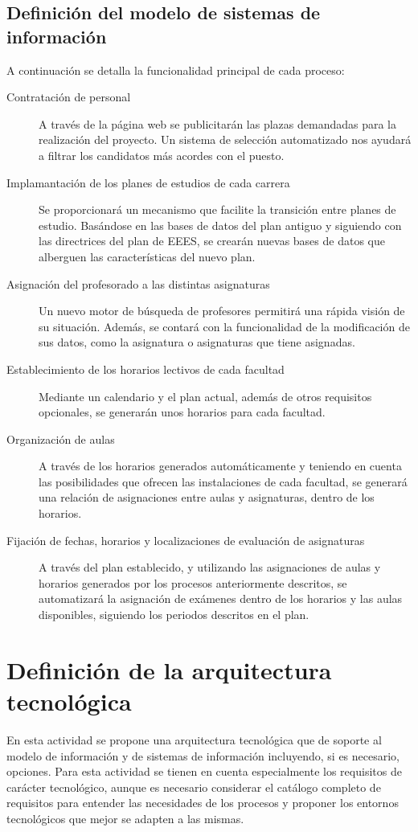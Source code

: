 \documentclass[11pt,a4paper,spanish,twoside]{book}
\begin{document}
\begin{itemize}
\section{Definición del modelo de sistemas de información}
A continuación se detalla la funcionalidad principal de cada proceso:
\begin{description}
\item[Contratación de personal] A través de la página web se publicitarán las plazas demandadas para la realización del proyecto. Un sistema de selección automatizado nos ayudará a filtrar los candidatos más acordes con el puesto.
\item[Implamantación de los planes de estudios de cada carrera] Se proporcionará un mecanismo que facilite la transición entre planes de estudio. Basándose en las bases de datos del plan antiguo y siguiendo con las directrices del plan de EEES, se crearán nuevas bases de datos que alberguen las características del nuevo plan.
\item[Asignación del profesorado a las distintas asignaturas] Un nuevo motor de búsqueda de profesores permitirá una rápida visión de su situación. Además, se contará con la funcionalidad de la modificación de sus datos, como la asignatura o asignaturas que tiene asignadas.
\item[Establecimiento de los horarios lectivos de cada facultad] Mediante un calendario y el plan actual, además de otros requisitos opcionales, se generarán unos horarios para cada facultad.
\item[Organización de aulas] A través de los horarios generados automáticamente y teniendo en cuenta las posibilidades que ofrecen las instalaciones de cada facultad, se generará una relación de asignaciones entre aulas y asignaturas, dentro de los horarios.
\item[Fijación de fechas, horarios y localizaciones de evaluación de asignaturas] A través del plan establecido, y utilizando las asignaciones de aulas y horarios generados por los procesos anteriormente descritos, se automatizará la asignación de exámenes dentro de los horarios y las aulas disponibles, siguiendo los periodos descritos en el plan.
\end{description}
 
\chapter{Definición de la arquitectura tecnológica}
En esta actividad se propone una arquitectura tecnológica que de soporte al
modelo de información y de sistemas de información incluyendo, si es
necesario, opciones. Para esta actividad se tienen en cuenta especialmente
los requisitos de carácter tecnológico, aunque es necesario considerar el
catálogo completo de requisitos para entender las necesidades de los procesos
y proponer los entornos tecnológicos que mejor se adapten a las mismas. 


\end{itemize}
\end{document}
